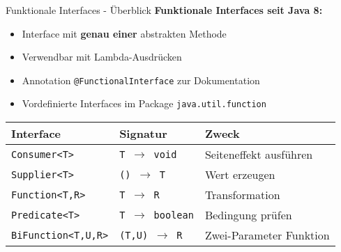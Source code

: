 \begin{frame}{Funktionale Interfaces - Überblick}
  \textbf{Funktionale Interfaces seit Java 8:}
  \begin{itemize}
    \item Interface mit \textbf{genau einer} abstrakten Methode
    \item Verwendbar mit Lambda-Ausdrücken
    \item Annotation \texttt{@FunctionalInterface} zur Dokumentation
    \item Vordefinierte Interfaces im Package \texttt{java.util.function}
  \end{itemize}

  \begin{center}
    \begin{tabular}{|l|l|l|}
    \hline
    \textbf{Interface} & \textbf{Signatur} & \textbf{Zweck} \\
    \hline
    \texttt{Consumer<T>} & \texttt{T $\rightarrow$ void} & Seiteneffekt ausführen \\
    \hline
    \texttt{Supplier<T>} & \texttt{() $\rightarrow$ T} & Wert erzeugen \\
    \hline
    \texttt{Function<T,R>} & \texttt{T $\rightarrow$ R} & Transformation \\
    \hline
    \texttt{Predicate<T>} & \texttt{T $\rightarrow$ boolean} & Bedingung prüfen \\
    \hline
    \texttt{BiFunction<T,U,R>} & \texttt{(T,U) $\rightarrow$ R} & Zwei-Parameter Funktion \\
    \hline
    \end{tabular}
  \end{center}
\end{frame}

